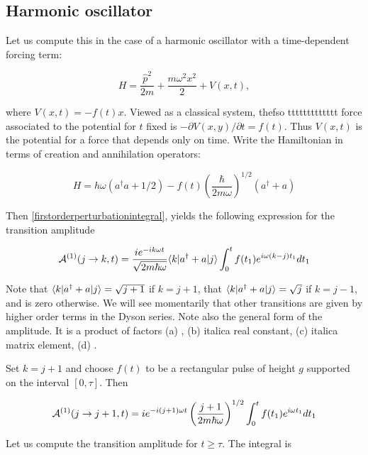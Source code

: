 \subsection{Harmonic oscillator}

Let us compute this in the case of a harmonic oscillator with a time-dependent forcing term:

\begin{equation}
H = \frac{\hat p^2}{2m} + \frac{m\omega^2 x^2}{2} + V(x,t),
\end{equation}

where $V(x,t) = -f(t)x$. Viewed as a classical system, thefso ttttttttttttt force associated to the potential for $t$ fixed is 
$-\partial V(x,y)/\partial t = f(t)$.  Thus $V(x,t)$ is the potential for a force that depends only on time.  Write the Hamiltonian in terms of creation and annihilation operators:

\begin{equation}
\label{transitionamplitude1}
H = h\omega(a^\dagger a + 1/2) - f(t)\left( \frac{\hbar}{2m\omega}\right)^{1/2} (a^\dagger + a)
\end{equation}

Then \eqref{firstorderperturbationintegral}, yields the following expression for the transition amplitude

\begin{equation}
\mathcal{A}^{(1)}(j \to k, t) = \frac{ie^{-ik\omega t}}{\sqrt{2m\hbar \omega}}\langle k | a^\dagger + a | j \rangle \int_0^t f(t_1)e^{i\omega (k-j) t_1} dt_1
\end{equation}

Note that $\langle k | a^\dagger + a | j \rangle = \sqrt{j+1}$ if $k = j +1$, that $\langle k | a^\dagger + a | j \rangle = \sqrt{j}$ if $k = j -1$, and is zero otherwise. We will see momentarily that other transitions are given by higher order terms in the Dyson series.  Note also the general form of the amplitude. It is a product of factors (a) , (b) italic{a real constant}, (c) italic{a matrix element}, (d) .  

Set $k  = j+1$ and choose $f(t)$ to be a rectangular pulse of height $g$ supported on the interval $[0,\tau]$.  Then

\begin{equation}
\mathcal{A}^{(1)}(j \to j+1, t) =ie^{-i(j+1)\omega t} \left(\frac{j+1}{2m\hbar \omega}\right)^{1/2} \int_0^t f(t_1)e^{i\omega  t_1} dt_1
\end{equation}

Let us compute the transition amplitude for  $t \ge \tau$.
The integral is

